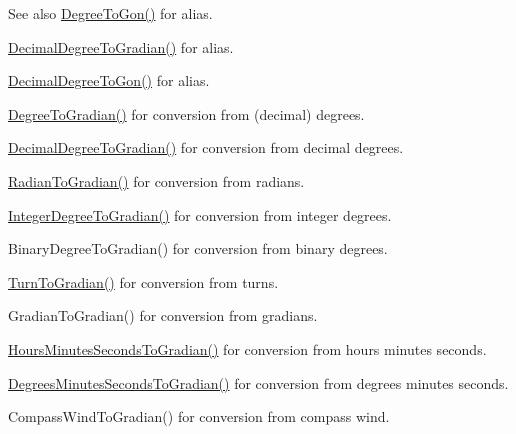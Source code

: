 \begin{DoxySeeAlso}{See also}
\mbox{\hyperlink{group___e_g_x_math-_conversions-_angle_conversions-_degree_ga87c3fab0867021e5d2501197b4db6194}{Degree\+To\+Gon()}} for alias. 

\mbox{\hyperlink{group___e_g_x_math-_conversions-_angle_conversions-_decimal_degree_ga3ac6f1ceb36a4938cdf3b55554734c99}{Decimal\+Degree\+To\+Gradian()}} for alias. 

\mbox{\hyperlink{group___e_g_x_math-_conversions-_angle_conversions-_decimal_degree_gaeb333a1ad0aeb913c025fbd1be85fcb3}{Decimal\+Degree\+To\+Gon()}} for alias. 

\mbox{\hyperlink{group___e_g_x_math-_conversions-_angle_conversions-_degree_ga25bb5506b3f66fff7a1b85bf7bd795b3}{Degree\+To\+Gradian()}} for conversion from (decimal) degrees. 

\mbox{\hyperlink{group___e_g_x_math-_conversions-_angle_conversions-_decimal_degree_ga3ac6f1ceb36a4938cdf3b55554734c99}{Decimal\+Degree\+To\+Gradian()}} for conversion from decimal degrees. 

\mbox{\hyperlink{group___e_g_x_math-_conversions-_angle_conversions-_radian_ga3c1607eae50cbf0186c42485bb3878d5}{Radian\+To\+Gradian()}} for conversion from radians. 

\mbox{\hyperlink{group___e_g_x_math-_conversions-_angle_conversions-_integer_degree_ga47127467ff7a8ef57f6be9ce496a97df}{Integer\+Degree\+To\+Gradian()}} for conversion from integer degrees. 

Binary\+Degree\+To\+Gradian() for conversion from binary degrees. 

\mbox{\hyperlink{group___e_g_x_math-_conversions-_angle_conversions-_turn_gad6aa9bdde2cde17cec136b24ee017bba}{Turn\+To\+Gradian()}} for conversion from turns. 

Gradian\+To\+Gradian() for conversion from gradians. 

\mbox{\hyperlink{group___e_g_x_math-_conversions-_angle_conversions-_hours_minutes_seconds_ga1731e750f3e5561313ee9d22adff747e}{Hours\+Minutes\+Seconds\+To\+Gradian()}} for conversion from hours minutes seconds. 

\mbox{\hyperlink{group___e_g_x_math-_conversions-_angle_conversions-_degrees_minutes_seconds_ga59e2c2b178f760c337fcb3ea7406570f}{Degrees\+Minutes\+Seconds\+To\+Gradian()}} for conversion from degrees minutes seconds. 

Compass\+Wind\+To\+Gradian() for conversion from compass wind. 
\end{DoxySeeAlso}
\mbox{\label{group___e_g_x_math-_conversions-_angle_conversions-_degree_ga0bb223ca6e77b00439a6d910ab32d82e}} 
